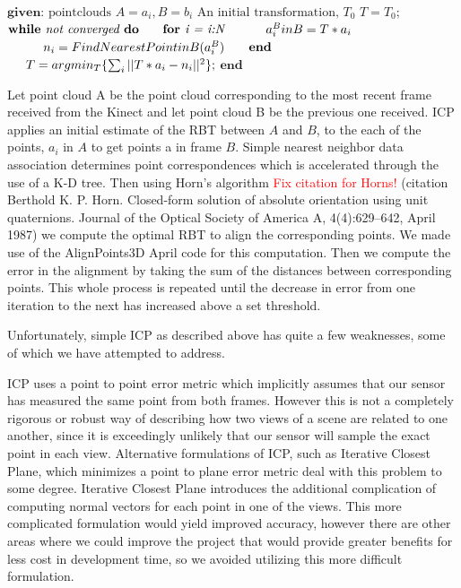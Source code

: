 \documentclass[letterpaper, 10pt, conference]{ieeeconf}
\newcommand{\xxx}[1]{\textcolor{red}{#1}}
\begin{document}
$\textbf{given: } \text{pointclouds } A = a_{i}, B = b_{i} $ \newline
$\text{An initial transformation, $T_{0}$} $ \newline
$T = T_{0}; $\newline 
$\textbf{while} \emph{ not converged} \textbf{ do} $\newline
$\hspace*{5 mm} \textbf{for } \emph{i = i:N} $\newline
$ \hspace*{10mm} a^{B}_{i} in B = T * a_i$ \newline
$ \hspace*{10 mm} n_{i} = Find Nearest Point in B(a^{B}_{i}) $ \newline
$ \hspace*{5 mm} \textbf{end} $ \newline
$ \hspace*{5 mm} T = argmin_{T} \{\sum_{i} ||T*a_{i} - n_{i} || ^2\}; $ \newline
$ \textbf{end} $ \newline

	Let point cloud A be the point cloud corresponding to the most recent frame received from the Kinect and let point cloud B be the previous one received.  ICP applies an initial estimate of the RBT between $A$ and $B$, to the each of the points, $a_{i}$ in $A$ to get points a in frame $B$.  Simple nearest neighbor data association determines point correspondences which is accelerated through the use of a K-D tree.  Then using Horn's algorithm \xxx{Fix citation for Horns!} (citation Berthold K. P. Horn. Closed-form solution of absolute orientation using unit quaternions. Journal of the Optical Society of America A, 4(4):629–642, April 1987) we compute the optimal RBT to align the corresponding points.  We made use of the AlignPoints3D April code for this computation.  Then we compute the error in the alignment by taking the sum of the distances between corresponding points.  This whole process is repeated until the decrease in error from one iteration to the next has increased above a set threshold.

	Unfortunately, simple ICP as described above has quite a few weaknesses, some of which we have attempted to address.  

	ICP uses a point to point error metric which implicitly assumes that our sensor has measured the same point from both frames.  However this is not a completely rigorous or robust way of describing how two views of a scene are related to one another, since it is exceedingly unlikely that our sensor will sample the exact point in each view.  Alternative formulations of ICP, such as Iterative Closest Plane, which minimizes a point to plane error metric deal with this problem to some degree.  Iterative Closest Plane introduces the additional complication of computing normal vectors for each point in one of the views.  This more complicated formulation would yield improved accuracy, however there are other areas where we could improve the project that would provide greater benefits for less cost in development time, so we avoided utilizing this more difficult formulation. 
\end{document}
